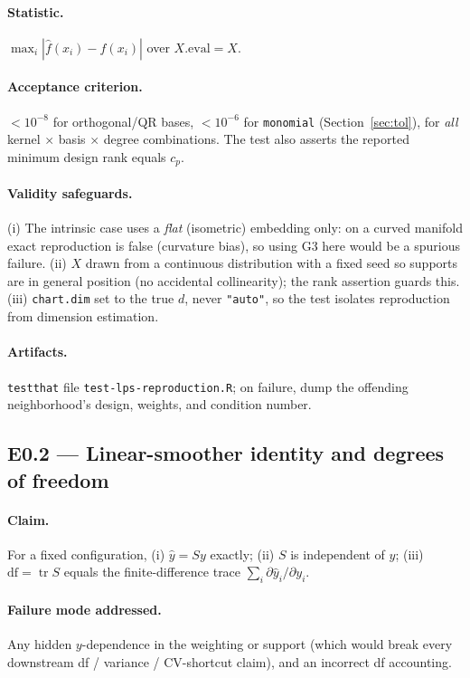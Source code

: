 \documentclass[11pt]{article}
\newcommand{\code}[1]{\texttt{#1}}
\newcommand{\tr}{\operatorname{tr}}
\begin{document}
\paragraph{Statistic.} $\max_i |\hat f(x_i)-f(x_i)|$ over $X.\mathrm{eval}=X$.

\paragraph{Acceptance criterion.} $<10^{-8}$ for orthogonal/QR bases, $<10^{-6}$ for
\code{monomial} (Section~\ref{sec:tol}), for \emph{all} kernel $\times$ basis $\times$ degree
combinations. The test also asserts the reported minimum design rank equals $c_p$.

\paragraph{Validity safeguards.} (i) The intrinsic case uses a \emph{flat} (isometric)
embedding only: on a curved manifold exact reproduction is false (curvature bias), so using
G3 here would be a spurious failure. (ii) $X$ drawn from a continuous distribution with a
fixed seed so supports are in general position (no accidental collinearity); the rank
assertion guards this. (iii) \code{chart.dim} set to the true $d$, never \code{"auto"}, so
the test isolates reproduction from dimension estimation.

\paragraph{Artifacts.} \code{testthat} file \code{test-lps-reproduction.R}; on failure,
dump the offending neighborhood's design, weights, and condition number.

\subsection{E0.2 — Linear-smoother identity and degrees of freedom}

\paragraph{Claim.} For a fixed configuration, (i) $\hat y = Sy$ exactly; (ii) $S$ is
independent of $y$; (iii) $\mathrm{df}=\tr S$ equals the finite-difference trace
$\sum_i \partial \hat y_i/\partial y_i$.

\paragraph{Failure mode addressed.} Any hidden $y$-dependence in the weighting or support
(which would break every downstream df / variance / CV-shortcut claim), and an incorrect df
accounting.
\end{document}
